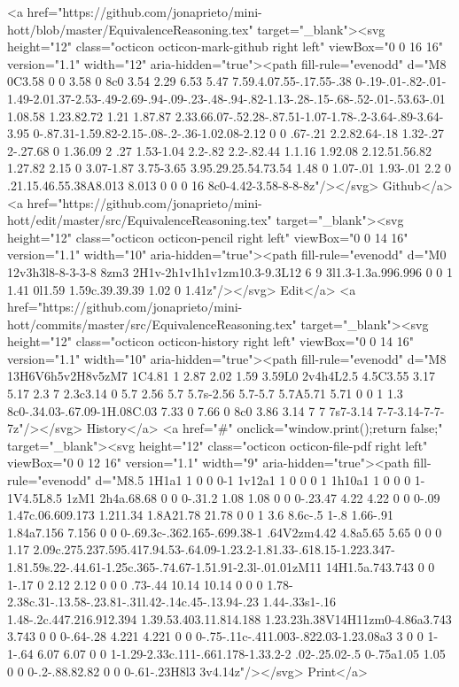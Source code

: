       <a href="https://github.com/jonaprieto/mini-hott/blob/master/EquivalenceReasoning.tex" target="_blank"><svg height="12" class="octicon octicon-mark-github right left" viewBox="0 0 16 16" version="1.1" width="12" aria-hidden="true"><path fill-rule="evenodd" d="M8 0C3.58 0 0 3.58 0 8c0 3.54 2.29 6.53 5.47 7.59.4.07.55-.17.55-.38 0-.19-.01-.82-.01-1.49-2.01.37-2.53-.49-2.69-.94-.09-.23-.48-.94-.82-1.13-.28-.15-.68-.52-.01-.53.63-.01 1.08.58 1.23.82.72 1.21 1.87.87 2.33.66.07-.52.28-.87.51-1.07-1.78-.2-3.64-.89-3.64-3.95 0-.87.31-1.59.82-2.15-.08-.2-.36-1.02.08-2.12 0 0 .67-.21 2.2.82.64-.18 1.32-.27 2-.27.68 0 1.36.09 2 .27 1.53-1.04 2.2-.82 2.2-.82.44 1.1.16 1.92.08 2.12.51.56.82 1.27.82 2.15 0 3.07-1.87 3.75-3.65 3.95.29.25.54.73.54 1.48 0 1.07-.01 1.93-.01 2.2 0 .21.15.46.55.38A8.013 8.013 0 0 0 16 8c0-4.42-3.58-8-8-8z"/></svg> Github</a>
      <a href="https://github.com/jonaprieto/mini-hott/edit/master/src/EquivalenceReasoning.tex" target="_blank"><svg height="12" class="octicon octicon-pencil right left" viewBox="0 0 14 16" version="1.1" width="10" aria-hidden="true"><path fill-rule="evenodd" d="M0 12v3h3l8-8-3-3-8 8zm3 2H1v-2h1v1h1v1zm10.3-9.3L12 6 9 3l1.3-1.3a.996.996 0 0 1 1.41 0l1.59 1.59c.39.39.39 1.02 0 1.41z"/></svg> Edit</a>
      <a href="https://github.com/jonaprieto/mini-hott/commits/master/src/EquivalenceReasoning.tex" target="_blank"><svg height="12" class="octicon octicon-history right left" viewBox="0 0 14 16" version="1.1" width="10" aria-hidden="true"><path fill-rule="evenodd" d="M8 13H6V6h5v2H8v5zM7 1C4.81 1 2.87 2.02 1.59 3.59L0 2v4h4L2.5 4.5C3.55 3.17 5.17 2.3 7 2.3c3.14 0 5.7 2.56 5.7 5.7s-2.56 5.7-5.7 5.7A5.71 5.71 0 0 1 1.3 8c0-.34.03-.67.09-1H.08C.03 7.33 0 7.66 0 8c0 3.86 3.14 7 7 7s7-3.14 7-7-3.14-7-7-7z"/></svg> History</a>
      <a  href="#" onclick="window.print();return false;" target="_blank"><svg height="12" class="octicon octicon-file-pdf right left" viewBox="0 0 12 16" version="1.1" width="9" aria-hidden="true"><path fill-rule="evenodd" d="M8.5 1H1a1 1 0 0 0-1 1v12a1 1 0 0 0 1 1h10a1 1 0 0 0 1-1V4.5L8.5 1zM1 2h4a.68.68 0 0 0-.31.2 1.08 1.08 0 0 0-.23.47 4.22 4.22 0 0 0-.09 1.47c.06.609.173 1.211.34 1.8A21.78 21.78 0 0 1 3.6 8.6c-.5 1-.8 1.66-.91 1.84a7.156 7.156 0 0 0-.69.3c-.362.165-.699.38-1 .64V2zm4.42 4.8a5.65 5.65 0 0 0 1.17 2.09c.275.237.595.417.94.53-.64.09-1.23.2-1.81.33-.618.15-1.223.347-1.81.59s.22-.44.61-1.25c.365-.74.67-1.51.91-2.3l-.01.01zM11 14H1.5a.743.743 0 0 1-.17 0 2.12 2.12 0 0 0 .73-.44 10.14 10.14 0 0 0 1.78-2.38c.31-.13.58-.23.81-.31l.42-.14c.45-.13.94-.23 1.44-.33s1-.16 1.48-.2c.447.216.912.394 1.39.53.403.11.814.188 1.23.23h.38V14H11zm0-4.86a3.743 3.743 0 0 0-.64-.28 4.221 4.221 0 0 0-.75-.11c-.411.003-.822.03-1.23.08a3 3 0 0 1-1-.64 6.07 6.07 0 0 1-1.29-2.33c.111-.661.178-1.33.2-2 .02-.25.02-.5 0-.75a1.05 1.05 0 0 0-.2-.88.82.82 0 0 0-.61-.23H8l3 3v4.14z"/></svg> Print</a>
